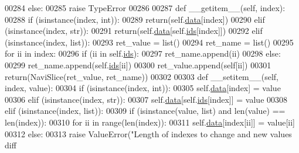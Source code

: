 \begin{DoxyCode}
00284         \textcolor{keywordflow}{else}:
00285             \textcolor{keywordflow}{raise} TypeError
00286 
00287     \textcolor{keyword}{def }\_\_getitem\_\_(self, index):
00288         \textcolor{keywordflow}{if} (isinstance(index, int)):
00289             \textcolor{keywordflow}{return}(self.\hyperlink{classnavicom_1_1navidata_1_1NaviSlice_a21ac86b9fbcb4ffc952782983690af5f}{data}[index])
00290         \textcolor{keywordflow}{elif} (isinstance(index, str)):
00291             \textcolor{keywordflow}{return}(self.\hyperlink{classnavicom_1_1navidata_1_1NaviSlice_a21ac86b9fbcb4ffc952782983690af5f}{data}[self.\hyperlink{classnavicom_1_1navidata_1_1NaviSlice_abc8769a0168ce54ee35624363deb0bcd}{ids}[index]])
00292         \textcolor{keywordflow}{elif} (isinstance(index, list)):
00293             ret\_value = list()
00294             ret\_name = list()
00295             \textcolor{keywordflow}{for} ii \textcolor{keywordflow}{in} index:
00296                 \textcolor{keywordflow}{if} (ii \textcolor{keywordflow}{in} self.\hyperlink{classnavicom_1_1navidata_1_1NaviSlice_abc8769a0168ce54ee35624363deb0bcd}{ids}):
00297                     ret\_name.append(ii)
00298                 \textcolor{keywordflow}{else}:
00299                     ret\_name.append(self.\hyperlink{classnavicom_1_1navidata_1_1NaviSlice_abc8769a0168ce54ee35624363deb0bcd}{ids}[ii])
00300                 ret\_value.append(self[ii])
00301             \textcolor{keywordflow}{return}(NaviSlice(ret\_value, ret\_name))
00302 
00303     \textcolor{keyword}{def }\_\_setitem\_\_(self, index, value):
00304         \textcolor{keywordflow}{if} (isinstance(index, int)):
00305             self.\hyperlink{classnavicom_1_1navidata_1_1NaviSlice_a21ac86b9fbcb4ffc952782983690af5f}{data}[index] = value
00306         \textcolor{keywordflow}{elif} (isinstance(index, str)):
00307             self.\hyperlink{classnavicom_1_1navidata_1_1NaviSlice_a21ac86b9fbcb4ffc952782983690af5f}{data}[self.\hyperlink{classnavicom_1_1navidata_1_1NaviSlice_abc8769a0168ce54ee35624363deb0bcd}{ids}[index]] = value
00308         \textcolor{keywordflow}{elif} (isinstance(index, list)):
00309             \textcolor{keywordflow}{if} (isinstance(value, list) \textcolor{keywordflow}{and} len(value) == len(index)):
00310                 \textcolor{keywordflow}{for} ii \textcolor{keywordflow}{in} range(len(index)):
00311                     self.\hyperlink{classnavicom_1_1navidata_1_1NaviSlice_a21ac86b9fbcb4ffc952782983690af5f}{data}[index[ii]] = value[ii]
00312             \textcolor{keywordflow}{else}:
00313                 \textcolor{keywordflow}{raise} ValueError(\textcolor{stringliteral}{"Length of indexes to change and new values diff
}
\end{DoxyCode}
